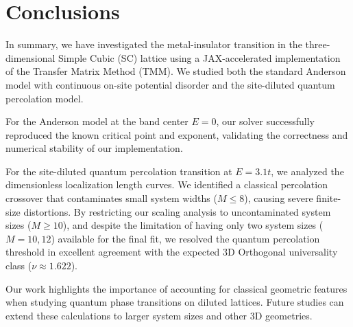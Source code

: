\section{Conclusions}
\label{sec:conclusions}

In summary, we have investigated the metal-insulator transition in the three-dimensional Simple Cubic (SC) lattice using a JAX-accelerated implementation of the Transfer Matrix Method (TMM). We studied both the standard Anderson model with continuous on-site potential disorder and the site-diluted quantum percolation model.

For the Anderson model at the band center $E=0$, our solver successfully reproduced the known critical point and exponent, 
validating the correctness and numerical stability of our implementation. 

For the site-diluted quantum percolation transition at $E=3.1t$, we analyzed the dimensionless localization length curves. We identified a classical percolation crossover that contaminates small system widths ($M \le 8$), causing severe finite-size distortions. By restricting our scaling analysis to uncontaminated system sizes ($M \ge 10$), and despite the limitation of having only two system sizes ($M=10, 12$) available for the final fit, we resolved the quantum percolation threshold 
in excellent agreement with the expected 3D Orthogonal universality class ($\nu \approx 1.622$). 

Our work highlights the importance of accounting for classical geometric features when studying quantum phase transitions on diluted lattices. Future studies can extend these calculations to larger system sizes and other 3D geometries.
